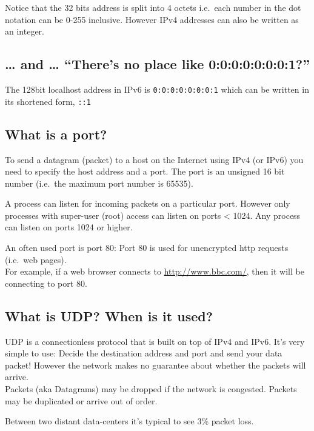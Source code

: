 Notice that the 32 bits address is split into 4 octets i.e.~each number
in the dot notation can be 0-255 inclusive. However IPv4 addresses can
also be written as an integer.

\subsection{\texorpdfstring{\ldots{} and \ldots{} ``There's no place
like
0:0:0:0:0:0:0:1?''}{\ldots{} and \ldots{} There's no place like 0:0:0:0:0:0:0:1?}}\label{and-theres-no-place-like-00000001}

The 128bit localhost address in IPv6 is \texttt{0:0:0:0:0:0:0:1} which
can be written in its shortened form, \texttt{::1}

\subsection{What is a port?}\label{what-is-a-port}

To send a datagram (packet) to a host on the Internet using IPv4 (or
IPv6) you need to specify the host address and a port. The port is an
unsigned 16 bit number (i.e.~the maximum port number is 65535).

A process can listen for incoming packets on a particular port. However
only processes with super-user (root) access can listen on ports
\textless{} 1024. Any process can listen on ports 1024 or higher.

An often used port is port 80: Port 80 is used for unencrypted http
requests (i.e.~web pages).\\For example, if a web browser connects to
\url{http://www.bbc.com/}, then it will be connecting to port 80.

\subsection{What is UDP? When is it
used?}\label{what-is-udp-when-is-it-used}

UDP is a connectionless protocol that is built on top of IPv4 and IPv6.
It's very simple to use: Decide the destination address and port and
send your data packet! However the network makes no guarantee about
whether the packets will arrive.\\Packets (aka Datagrams) may be dropped
if the network is congested. Packets may be duplicated or arrive out of
order.

Between two distant data-centers it's typical to see 3\% packet loss.

